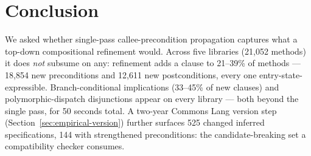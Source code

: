 \section{Conclusion}
\label{sec:conclusion}

We asked whether single-pass callee-precondition propagation captures what a top-down compositional refinement would. Across five libraries (21{,}052 methods) it does \emph{not} subsume on any: refinement adds a clause to 21--39\% of methods --- 18{,}854 new preconditions and 12{,}611 new postconditions, every one entry-state-expressible. Branch-conditional implications (33--45\% of new clauses) and polymorphic-dispatch disjunctions appear on every library --- both beyond the single pass, for 50 seconds total. A two-year Commons Lang version step (Section~\ref{sec:empirical-version}) further surfaces 525 changed inferred specifications, 144 with strengthened preconditions: the candidate-breaking set a compatibility checker consumes.
